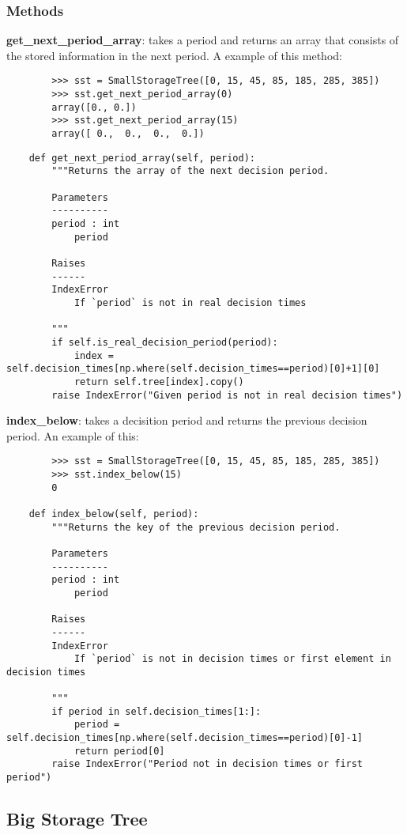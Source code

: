 \documentclass[12pt]{article}
\begin{document}
\subsubsection{Methods}
\textbf{get\_next\_period\_array}: takes a period and returns an array that consists of the stored information in the next period. A example of this method:
\begin{verbatim}
		>>> sst = SmallStorageTree([0, 15, 45, 85, 185, 285, 385])
		>>> sst.get_next_period_array(0)
		array([0., 0.])
		>>> sst.get_next_period_array(15)
		array([ 0.,  0.,  0.,  0.])
\end{verbatim}
\begin{verbatim}
	def get_next_period_array(self, period):
		"""Returns the array of the next decision period.

		Parameters
		----------
		period : int
			period

		Raises
		------
		IndexError
			If `period` is not in real decision times

		"""
		if self.is_real_decision_period(period):
			index = self.decision_times[np.where(self.decision_times==period)[0]+1][0]
			return self.tree[index].copy()
		raise IndexError("Given period is not in real decision times")
\end{verbatim}
\textbf{index\_below}: takes a decisition period and returns the previous decision period. An example of this:
\begin{verbatim}
		>>> sst = SmallStorageTree([0, 15, 45, 85, 185, 285, 385])
		>>> sst.index_below(15)
		0
		
	def index_below(self, period):
		"""Returns the key of the previous decision period.

		Parameters
		----------
		period : int
			period

		Raises
		------
		IndexError
			If `period` is not in decision times or first element in decision times

		"""
		if period in self.decision_times[1:]:
			period = self.decision_times[np.where(self.decision_times==period)[0]-1]
			return period[0]
		raise IndexError("Period not in decision times or first period")
\end{verbatim}








\subsection{Big Storage Tree}
\end{document}
